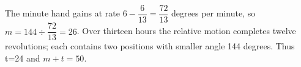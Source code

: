 The minute hand gains at rate $6-\dfrac{6}{13}=\dfrac{72}{13}$ degrees per minute, so $m=144\div\dfrac{72}{13}=26$. Over thirteen hours the relative motion completes twelve revolutions; each contains two positions with smaller angle 144 degrees. Thus t=24 and $\boxed{m+t=50}$.
